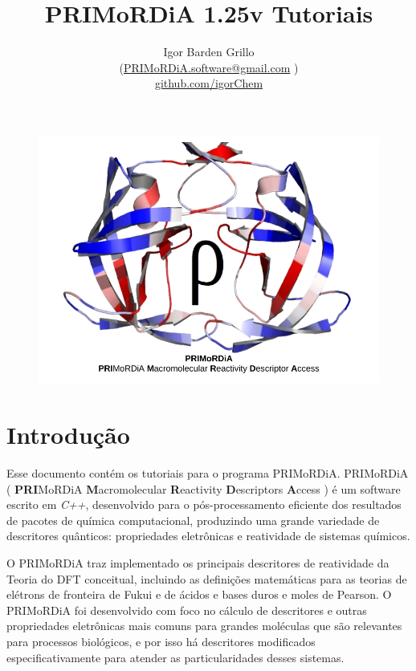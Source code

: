 \documentclass[a4paper,11pt]{refart}
\title{ \huge {PRIMoRDiA 1.25v Tutoriais} }
\author{Igor Barden Grillo \\(\url{PRIMoRDiA.software@gmail.com} )\\\url{github.com/igorChem}}
\begin{document}
	\maketitle


\hspace*{-1.2\leftmarginwidth}
\begin{minipage}{\fullwidth}
\begin{figure}[H]
\begin{center}
\includegraphics[width=7in]{images/logo_primordia}
\end{center}
\end{figure}	
\end{minipage}	
\newpage
			
\newpage
\tableofcontents
\newpage

\section*{Introdução}


Esse documento contém os tutoriais para o programa PRIMoRDiA. PRIMoRDiA ( \textbf{PRI}MoRDiA \textbf{M}acromolecular \textbf{R}eactivity \textbf{D}escriptors \textbf{A}ccess ) é um software escrito em \emph{C++}, desenvolvido para o pós-processamento eficiente dos resultados de pacotes de química computacional, produzindo uma grande variedade de descritores quânticos: propriedades eletrônicas e reatividade de sistemas químicos. 

O PRIMoRDiA traz implementado os principais descritores de reatividade da Teoria do DFT conceitual, incluindo as definições matemáticas para as teorias de elétrons de fronteira de Fukui e de ácidos e bases duros e moles de Pearson. O PRIMoRDiA foi desenvolvido com foco no cálculo de descritores e outras propriedades eletrônicas mais comuns para grandes moléculas que são relevantes para processos biológicos, e por isso há descritores modificados especificativamente para atender as particularidades desses sistemas. 
\end{document}
